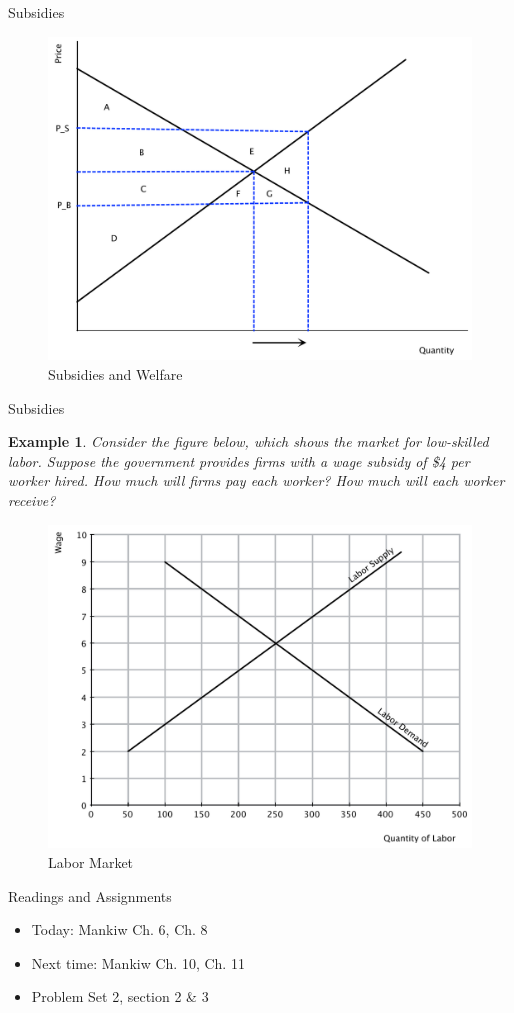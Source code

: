 \documentclass[xcolor={dvipsnames},pdf, hyperref={colorlinks=true, citecolor=ForestGreen, linkcolor=BlueViolet, urlcolor=Magenta}]{beamer}
\newtheorem{exmp}{Example}[section]
\begin{document}
\begin{frame}{Subsidies}
	\begin{figure}[H]
		\centering
		\includegraphics[scale=.3]{subsidy.pdf}
		\caption{Subsidies and Welfare}
	\end{figure}
\end{frame}

\begin{frame}{Subsidies}
	\begin{exmp}
		\scriptsize
		Consider the figure below, which shows the market for low-skilled labor. Suppose the government provides firms with a wage subsidy of \$4 per worker hired. How much will firms pay each worker? How much will each worker receive?

	\end{exmp}

	\begin{figure}[H]
	\centering
	\includegraphics[scale=.3]{laborsubsidy.pdf}
	\caption{\scriptsize Labor Market}
\end{figure}

\end{frame}




\begin{frame}{Readings and Assignments}
\begin{itemize}
	\item Today: Mankiw Ch. 6, Ch. 8
	\item Next time: Mankiw Ch. 10, Ch. 11
	\item Problem Set 2, section 2 \& 3
\end{itemize}
\end{frame}
\end{document}
